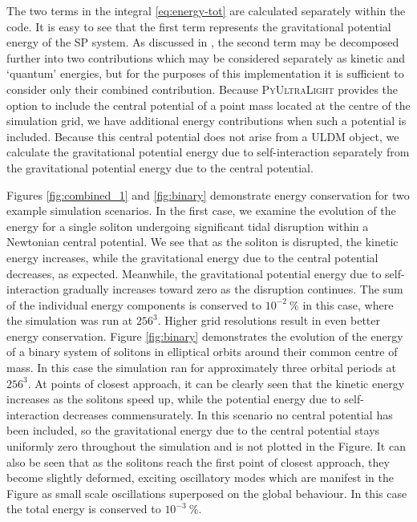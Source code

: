 \documentclass[a4paper,11pt]{article}
\newcommand{\PyUltraLight}{\textsc{PyUltraLight }}
\begin{document}
The two terms in the integral \ref{eq:energy-tot} are calculated separately within the code. It is easy to see that the first term represents the gravitational potential energy of the SP system. As discussed in \cite{Hui2016}, the second term may be decomposed further into two contributions which may be considered separately as kinetic and `quantum' energies, but for the purposes of this implementation it is sufficient to consider only their combined contribution. Because \PyUltraLight provides the option to include the central potential of a point mass located at the centre of the simulation grid, we have additional energy contributions when such a potential is included. Because this central potential does not arise from a ULDM object, we calculate the gravitational potential energy due to self-interaction separately from the gravitational potential energy due to the central potential.

Figures \ref{fig:combined_1} and \ref{fig:binary} demonstrate energy conservation for two example simulation scenarios. In the first case, we examine the evolution of the energy for a single soliton undergoing significant tidal disruption within a Newtonian central potential. We see that as the soliton is disrupted, the kinetic energy increases, while the gravitational energy due to the central potential decreases, as expected. Meanwhile, the gravitational potential energy due to self-interaction gradually increases toward zero as the disruption continues. The sum of the individual energy components is conserved to $10^{-2}\ \%$ in this case, where the simulation was run at $256^3$. Higher grid resolutions result in even better energy conservation. Figure \ref{fig:binary} demonstrates the evolution of the energy of a binary system of solitons in elliptical orbits around their common centre of mass. In this case the simulation ran for approximately three orbital periods at $256^3$. At points of closest approach, it can be clearly seen that the kinetic energy increases as the solitons speed up, while the potential energy due to self-interaction decreases commensurately. In this scenario no central potential has been included, so the gravitational energy due to the central potential stays uniformly zero throughout the simulation and is not plotted in the Figure. It can also be seen that as the solitons reach the first point of closest approach, they become slightly deformed, exciting oscillatory modes which are manifest in the Figure as small scale oscillations superposed on the global behaviour. In this case the total energy is conserved to $10^{-3}\ \%$.
\end{document}
